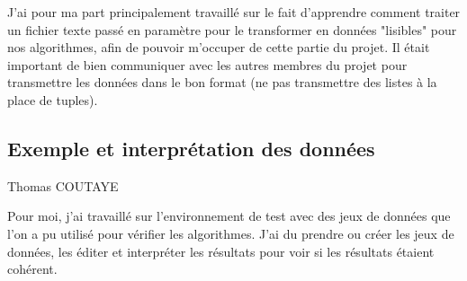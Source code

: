 \documentclass{article}
\begin{document}
J'ai pour ma part principalement travaillé sur le fait d'apprendre comment traiter un fichier texte passé en paramètre pour le transformer en données
"lisibles" pour nos algorithmes, afin de pouvoir m'occuper de cette partie du projet. Il était important de bien communiquer avec les autres membres du 
projet pour transmettre les données dans le bon format (ne pas transmettre des listes à la place de tuples).

\subsection{Exemple et interprétation des données}
Thomas COUTAYE

Pour moi, j'ai travaillé sur l'environnement de test avec des jeux de données que l'on a pu utilisé pour vérifier les algorithmes.
J'ai du prendre ou créer les jeux de données, les éditer et interpréter les résultats pour voir si les résultats étaient cohérent.
\end{document}
